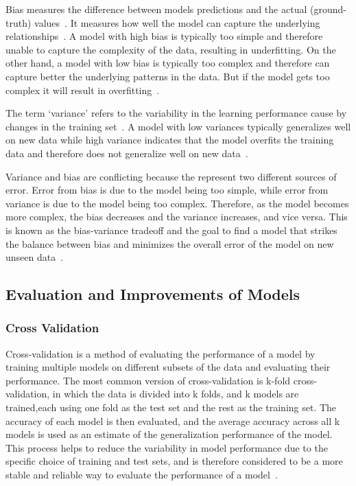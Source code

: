Bias measures the difference between models predictions and the actual
(ground-truth) values~\cite[p. 51]{zhou_machinelearning_2021}.
It measures how well the model can capture the underlying
relationships~\cite[p. 7--8]{neal_biasvariancetradeofftextbooks_2019}.
A model with high bias is typically too simple and therefore unable to capture the complexity of the data, resulting
in underfitting.
On the other hand, a model with low bias is typically too complex and therefore can capture better the underlying
patterns in the data. But if the model gets too complex it will result in
overfitting~\cite[p. 20]{neal_biasvariancetradeofftextbooks_2019}.

The term `variance' refers to the variability in the learning performance cause by changes in the training
set~\cite[p. 51]{zhou_machinelearning_2021}.
A model with low variances typically generalizes well on new data while high variance indicates that the model
overfits the training data and therefore does not generalize well on new
data~\cite[p. 7--8]{neal_biasvariancetradeofftextbooks_2019}.

Variance and bias are conflicting because the represent two different sources of error.
Error from bias is due to the model being too simple, while error from variance is due to the model being too
complex.
Therefore, as the model becomes more complex, the bias decreases and the variance increases, and vice versa.
This is known as the bias-variance tradeoff and the goal to find a model that strikes the balance between
bias and minimizes the overall error of the model on new unseen
data~\cite[p. 9]{neal_biasvariancetradeofftextbooks_2019}.

\subsection{Evaluation and Improvements of Models}\label{subsec:evaluations-and-improvements-of-models}

\subsubsection{Cross Validation}\label{subsubsec:cross-validation}
Cross-validation is a method of evaluating the performance of a model by training
multiple models on different subsets of the data and evaluating their performance.
The most common version of cross-validation is k-fold cross-validation, in which the data is divided into k folds,
and k models are trained,each using one fold as the test set and the rest as the training set.
The accuracy of each model is then evaluated, and the average accuracy across all k
models is used as an estimate of the generalization performance of the model.
This process helps to reduce the variability in model performance due to the specific choice of training and test
sets, and is therefore considered to be a more stable and reliable way to evaluate the performance of a
model~\cite[p. 252--260]{muller_introductionmachinelearning_2016}.

